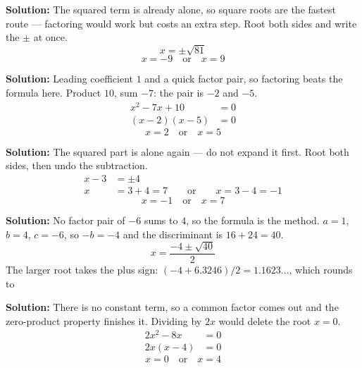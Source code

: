 \documentclass[12pt]{article}
\begin{document}




\textbf{Solution:} The squared term is already alone, so square roots are the fastest route --- factoring would work but costs an extra step. Root both sides and write the $\pm$ at once.
\[ x = \pm\sqrt{81} \]
\[ \boxed{x = -9 \quad \text{or} \quad x = 9} \]


\textbf{Solution:} Leading coefficient $1$ and a quick factor pair, so factoring beats the formula here. Product $10$, sum $-7$: the pair is $-2$ and $-5$.
\begin{align*}
  x^2 - 7x + 10 &= 0 \\
  (x-2)(x-5) &= 0
\end{align*}
\[ \boxed{x = 2 \quad \text{or} \quad x = 5} \]


\textbf{Solution:} The squared part is alone again --- do not expand it first. Root both sides, then undo the subtraction.
\begin{align*}
  x - 3 &= \pm 4 \\
  x &= 3 + 4 = 7 \qquad \text{or} \qquad x = 3 - 4 = -1
\end{align*}
\[ \boxed{x = -1 \quad \text{or} \quad x = 7} \]


\textbf{Solution:} No factor pair of $-6$ sums to $4$, so the formula is the method. $a = 1$, $b = 4$, $c = -6$, so $-b = -4$ and the discriminant is $16 + 24 = 40$.
\[ x = \frac{-4 \pm \sqrt{40}}{2} \]
The larger root takes the plus sign: $(-4 + 6.3246)/2 = 1.1623\ldots$, which rounds to 


\textbf{Solution:} There is no constant term, so a common factor comes out and the zero-product property finishes it. Dividing by $2x$ would delete the root $x = 0$.
\begin{align*}
  2x^2 - 8x &= 0 \\
  2x(x-4) &= 0
\end{align*}
\[ \boxed{x = 0 \quad \text{or} \quad x = 4} \]

\end{document}
